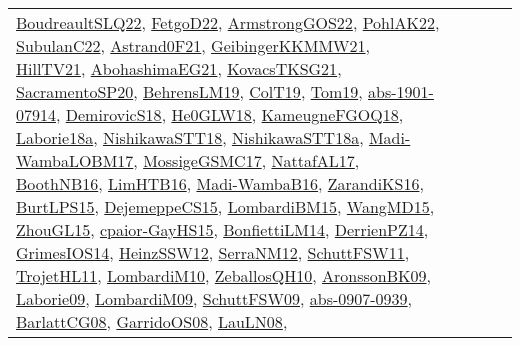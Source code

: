 {\begin{longtable}{lp{3cm}>{\raggedright}p{6cm}>{\raggedright}p{6cm}p{8cm}}
\href{papers/BoudreaultSLQ22.pdf}{BoudreaultSLQ22}\cite{BoudreaultSLQ22}, \href{articles/FetgoD22.pdf}{FetgoD22}\cite{FetgoD22}, \href{papers/ArmstrongGOS22.pdf}{ArmstrongGOS22}\cite{ArmstrongGOS22}, \href{articles/PohlAK22.pdf}{PohlAK22}\cite{PohlAK22}, \href{articles/SubulanC22.pdf}{SubulanC22}\cite{SubulanC22}, \href{papers/Astrand0F21.pdf}{Astrand0F21}\cite{Astrand0F21}, \href{papers/GeibingerKKMMW21.pdf}{GeibingerKKMMW21}\cite{GeibingerKKMMW21}, \href{papers/HillTV21.pdf}{HillTV21}\cite{HillTV21}, \href{articles/AbohashimaEG21.pdf}{AbohashimaEG21}\cite{AbohashimaEG21}, \href{papers/KovacsTKSG21.pdf}{KovacsTKSG21}\cite{KovacsTKSG21}, \href{articles/SacramentoSP20.pdf}{SacramentoSP20}\cite{SacramentoSP20}, \href{papers/BehrensLM19.pdf}{BehrensLM19}\cite{BehrensLM19}, \href{papers/ColT19.pdf}{ColT19}\cite{ColT19}, \href{papers/Tom19.pdf}{Tom19}\cite{Tom19}, \href{articles/abs-1901-07914.pdf}{abs-1901-07914}\cite{abs-1901-07914}, \href{papers/DemirovicS18.pdf}{DemirovicS18}\cite{DemirovicS18}, \href{papers/He0GLW18.pdf}{He0GLW18}\cite{He0GLW18}, \href{papers/KameugneFGOQ18.pdf}{KameugneFGOQ18}\cite{KameugneFGOQ18}, \href{papers/Laborie18a.pdf}{Laborie18a}\cite{Laborie18a}, \href{papers/NishikawaSTT18.pdf}{NishikawaSTT18}\cite{NishikawaSTT18}, \href{papers/NishikawaSTT18a.pdf}{NishikawaSTT18a}\cite{NishikawaSTT18a}, \href{papers/Madi-WambaLOBM17.pdf}{Madi-WambaLOBM17}\cite{Madi-WambaLOBM17}, \href{papers/MossigeGSMC17.pdf}{MossigeGSMC17}\cite{MossigeGSMC17}, \href{articles/NattafAL17.pdf}{NattafAL17}\cite{NattafAL17}, \href{papers/BoothNB16.pdf}{BoothNB16}\cite{BoothNB16}, \href{papers/LimHTB16.pdf}{LimHTB16}\cite{LimHTB16}, \href{papers/Madi-WambaB16.pdf}{Madi-WambaB16}\cite{Madi-WambaB16}, \href{articles/ZarandiKS16.pdf}{ZarandiKS16}\cite{ZarandiKS16}, \href{papers/BurtLPS15.pdf}{BurtLPS15}\cite{BurtLPS15}, \href{papers/DejemeppeCS15.pdf}{DejemeppeCS15}\cite{DejemeppeCS15}, \href{papers/LombardiBM15.pdf}{LombardiBM15}\cite{LombardiBM15}, \href{articles/WangMD15.pdf}{WangMD15}\cite{WangMD15}, \href{papers/ZhouGL15.pdf}{ZhouGL15}\cite{ZhouGL15}, \href{papers/cpaior-GayHS15.pdf}{cpaior-GayHS15}\cite{cpaior-GayHS15}, \href{papers/BonfiettiLM14.pdf}{BonfiettiLM14}\cite{BonfiettiLM14}, \href{papers/DerrienPZ14.pdf}{DerrienPZ14}\cite{DerrienPZ14}, \href{articles/GrimesIOS14.pdf}{GrimesIOS14}\cite{GrimesIOS14}, \href{articles/HeinzSSW12.pdf}{HeinzSSW12}\cite{HeinzSSW12}, \href{papers/SerraNM12.pdf}{SerraNM12}\cite{SerraNM12}, \href{articles/SchuttFSW11.pdf}{SchuttFSW11}\cite{SchuttFSW11}, \href{articles/TrojetHL11.pdf}{TrojetHL11}\cite{TrojetHL11}, \href{papers/LombardiM10.pdf}{LombardiM10}\cite{LombardiM10}, \href{articles/ZeballosQH10.pdf}{ZeballosQH10}\cite{ZeballosQH10}, \href{papers/AronssonBK09.pdf}{AronssonBK09}\cite{AronssonBK09}, \href{papers/Laborie09.pdf}{Laborie09}\cite{Laborie09}, \href{papers/LombardiM09.pdf}{LombardiM09}\cite{LombardiM09}, \href{papers/SchuttFSW09.pdf}{SchuttFSW09}\cite{SchuttFSW09}, \href{articles/abs-0907-0939.pdf}{abs-0907-0939}\cite{abs-0907-0939}, \href{papers/BarlattCG08.pdf}{BarlattCG08}\cite{BarlattCG08}, \href{articles/GarridoOS08.pdf}{GarridoOS08}\cite{GarridoOS08}, \href{papers/LauLN08.pdf}{LauLN08}\cite{LauLN08}, 
\end{longtable}}
